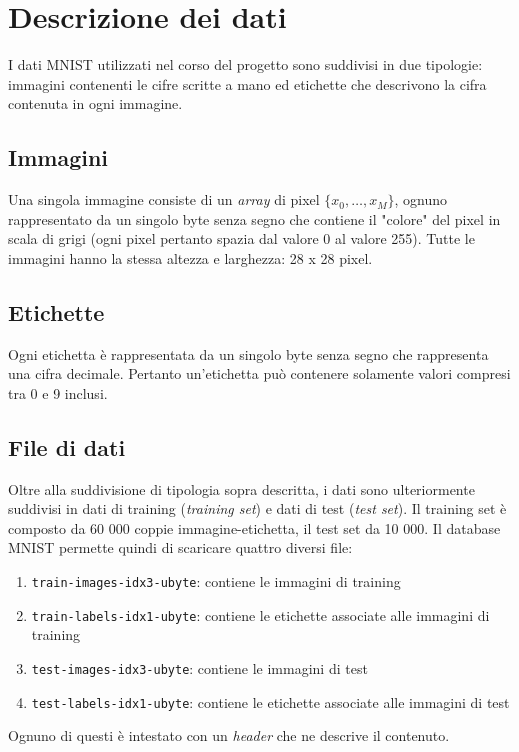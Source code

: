 
\section{Descrizione dei dati} \label{sec:data}
I dati MNIST utilizzati nel corso del progetto sono suddivisi in due tipologie: immagini contenenti le cifre scritte a mano ed etichette che descrivono la cifra contenuta in ogni immagine.

\subsection{Immagini}
Una singola immagine consiste di un {\it array} di pixel \(\{x_0, \dotsc, x_M\}\), ognuno rappresentato da un singolo byte senza segno che contiene il "colore" del pixel in scala di grigi (ogni pixel pertanto spazia dal valore 0 al valore 255). Tutte le immagini hanno la stessa altezza e larghezza: 28 x 28 pixel.

\subsection{Etichette}
Ogni etichetta \`e rappresentata da un singolo byte senza segno che rappresenta una cifra decimale. Pertanto un'etichetta pu\`o contenere solamente valori compresi tra 0 e 9 inclusi.

\subsection{File di dati}
 Oltre alla suddivisione di tipologia sopra descritta, i dati sono ulteriormente suddivisi in dati di training ({\it training set}) e dati di test ({\it test set}). Il training set \`e composto da 60 000 coppie immagine-etichetta, il test set da 10 000.
 Il database MNIST permette quindi di scaricare quattro diversi file:
\begin{enumerate}
	\item {\tt train-images-idx3-ubyte}: contiene le immagini di training
	\item {\tt train-labels-idx1-ubyte}: contiene le etichette associate alle immagini di training
	\item {\tt test-images-idx3-ubyte}: contiene le immagini di test
	\item {\tt test-labels-idx1-ubyte}: contiene le etichette associate alle immagini di test
\end{enumerate}
Ognuno di questi \`e intestato con un {\it header} che ne descrive il contenuto.